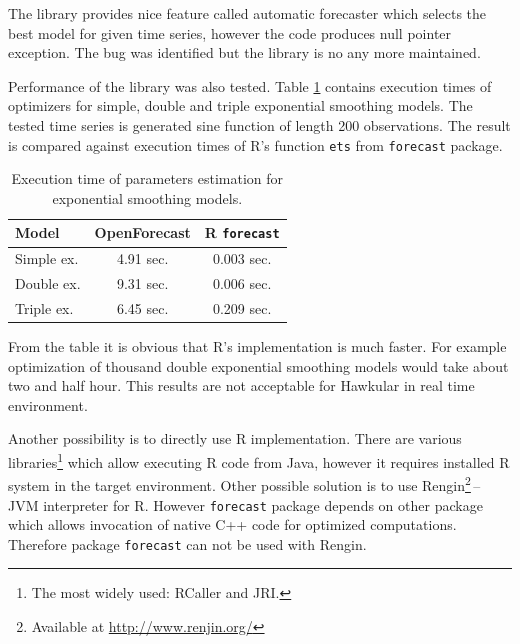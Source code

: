     The library provides nice feature called automatic forecaster which selects the best model for given
    time series, however the code produces null pointer exception. The bug was identified but the library is no any more
    maintained.

    Performance of the library was also tested. Table \ref{tab:open-forecast-perf} contains execution times of
    optimizers for simple, double and triple exponential smoothing models. The tested time series is generated sine
    function of length 200 observations. The result is compared against execution times of R's function \texttt{ets}
    from \texttt{forecast} package.

    \begin{table}[h]
        \begin{center}
            \begin{tabular}{l|c|c}
                \textbf{Model} & \textbf{OpenForecast} & \textbf{R \texttt{forecast}} \\ \hline \hline
                Simple ex. & 4.91 sec. & 0.003 sec.\\
                Double ex. & 9.31 sec. & 0.006 sec.\\
                Triple ex. & 6.45 sec. & 0.209 sec.\\
            \end{tabular}
            \caption{Execution time of parameters estimation for exponential smoothing models.}
            \label{tab:open-forecast-perf}
        \end{center}
    \end{table}

    From the table it is obvious that R's implementation is much faster. For example optimization of thousand double
    exponential smoothing models would take about two and half hour. This results are not acceptable for Hawkular in
    real time environment.

    Another possibility is to directly use R implementation. There are various libraries\footnote{The most widely used:
    RCaller and JRI.} which allow executing R code from Java, however it requires installed R system in the target
    environment. Other possible solution is to use Rengin\footnote{Available at \url{http://www.renjin.org/}}\,--\,
    JVM  interpreter for R. However \texttt{forecast} package depends on other package which allows invocation of native
    C++ code for optimized computations. Therefore package \texttt{forecast} can not be used with Rengin.


